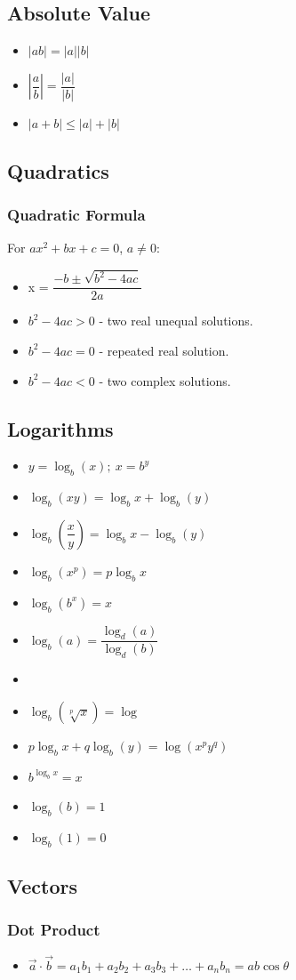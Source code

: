 \documentclass[]{report}
\newcommand \tab[1][1cm]{\hspace*{#1}}
\newcommand{\itemt}{\item \tab}
\begin{document}
\subsection{Absolute Value}
\begin{itemize}
\itemt \( |ab|=|a||b| \)
\itemt \( |\dfrac{a}{b}| = \dfrac{|a|}{|b|} \)
\itemt \( |a+b| \leq |a|+|b| \)
\end{itemize}

\subsection{Quadratics}

\subsubsection{Quadratic Formula}
For $ax^2 + bx + c = 0$, $a\neq 0$:
\begin{itemize}
\itemt x = \( \dfrac{-b \pm \sqrt{b^2 - 4ac}}{2a} \)
\itemt \( b^2 - 4ac > 0 \) - two real unequal solutions.
\itemt \( b^2 - 4ac = 0 \) - repeated real solution.
\itemt \( b^2 - 4ac < 0 \) - two complex solutions.
\end{itemize}

\subsection{Logarithms}

\begin{itemize}
\itemt \( y = \log_b (x);\ x = b^y \)
\itemt \( \log_b(xy) = \log_bx + \log_b(y) \)
\itemt \( \log_b(\dfrac{x}{y}) = \log_bx - \log_b(y) \)
\itemt \( \log_b(x^p) = p\log_bx \)
\itemt \( \log_b(b^x) = x \)
\itemt \( \log_b(a) = \dfrac{\log_d(a)}{\log_d(b)} \)
\item[]
\itemt \( \log_b(\sqrt[p]{x}) = \log \)
\itemt \( p\log_bx + q\log_b(y) = \log(x^p y^q) \)
\itemt \( b^{\log_bx} = x \)
\itemt \( \log_b(b) = 1 \)
\itemt \( \log_b(1) = 0 \)
\end{itemize}

\subsection{Vectors}

\subsubsection{Dot Product}
\begin{itemize}
\itemt \( \vec{a} \cdot \vec{b} = a_1b_1 + a_2b_2 + a_3b_3 + \ldots +a_nb_n = ab\cos\theta \)
\end{itemize}
\end{document}
